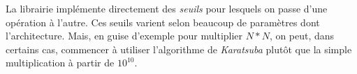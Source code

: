 \documentclass[letterpaper]{article}
\begin{document}
La librairie implémente directement des \emph{seuils} pour lesquels
on passe d'une opération à l'autre. Ces seuils varient selon
beaucoup de paramètres dont l'architecture. Mais, en guise d'exemple
pour multiplier $N*N$, on peut, dans certains cas, commencer à utiliser
l'algorithme de \emph{Karatsuba} plutôt que la simple multiplication
à partir de $10^{10}$\cite{gmplibkaratsuba}.


\footnotesize


\end{document}
